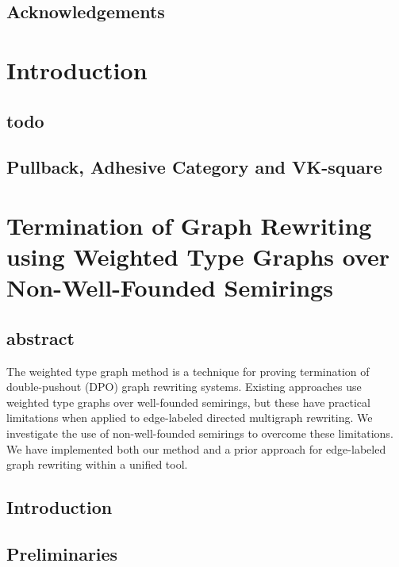 \documentclass{book}
\begin{document}
  
  
  

\section*{Acknowledgements}

\newpage      


\tableofcontents  
\newpage      
 
\chapter{Introduction}
\section{todo}
\section{Pullback, Adhesive Category and VK-square}


\chapter{Termination of Graph Rewriting
using Weighted Type Graphs
over Non-Well-Founded Semirings}

\section{abstract}
The weighted type graph method is a technique for proving termination of double-pushout (DPO) graph rewriting systems. 
Existing approaches use weighted type graphs over well-founded semirings, but these have practical limitations when applied to edge-labeled directed multigraph rewriting.
We investigate the use of non-well-founded semirings to overcome these limitations.
We have implemented both our method and a prior approach for edge-labeled graph rewriting within a unified tool.
\section{Introduction}

\label{sec:type_graph:introduction}

 
\section{Preliminaries}
\label{sec:type_graph:preliminaries}
 
\end{document}
